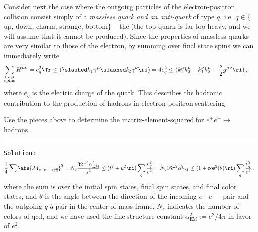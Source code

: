 \begin{example}
    Consider next the case where the outgoing particles of the electron-positron collision consist simply of a \textit{massless quark and an anti-quark} of type \(q\), i.e. \(q \in \{\)up, down, charm, strange, bottom\(\}\) -- the  (the top quark is far too heavy, and we will assume that it cannot be produced).
    Since the properties of massless quarks are very similar to those of the electron, by summing over final state spins we can immediately write
    \begin{align}
        \sum_{\substack{\text{final}\\\text{spins}}}
        H^{\mu \nu}
        &=
        e_q^2
        \Tr\le(\slashed k_1 \gamma^\mu \slashed k_2 \gamma^\nu \ri)
        =
        4 e_q^2
        \le(
            k_1^\mu k_2^\nu + k_1^\nu k_2^\mu - \frac{s}{2} g^{\mu \nu}
        \ri)
        \,,
    \end{align}
    where \(e_q\) is the electric charge of the quark.
    This describes the  hadronic contribution to the production of hadrons in electron-positron scattering.
\end{example}

\begin{exercise}
    \label{ex:born-matrix-el}
    Use the pieces above to determine the  matrix-element-squared for \(e^+ e^-\to\,\)hadrons.

    \vspace{7pt}
    \hrule
    \vspace{7pt}

    \texttt{Solution:}
    \begin{align}
        \frac{1}{4}
        \sum
        \abs{\mathcal{M}_{e^+ e^- \to q \overline{q}}}^2
        =
        N_c
        \frac{32\pi^2 \alpha_\text{EM}^2}{s^2}
        \le(
            t^2 + u^2
        \ri)
        \sum_q \frac{e_q^2}{e^2}
        =
        N_c
        16\pi^2 \alpha_\text{EM}^2
        \,
        \le(1 + \cos^2(\theta)\ri)
        \sum_q \frac{e_q^2}{e^2}
        \,,
    \end{align}
    where the sum is over the initial spin states, final spin states, and final color states, and \(\theta\) is the angle between the direction of the incoming \(e^+\)-\(e-\) pair and the outgoing \(q\)-\(\overline{q}\) pair in the center of mass frame.
    \(N_c\) indicates the number of colors of \gls{qcd}, and we have used the fine-structure constant \(\alpha_\text{EM}^2 := e^2 / 4\pi\) in favor of \(e^2\).
\end{exercise}




